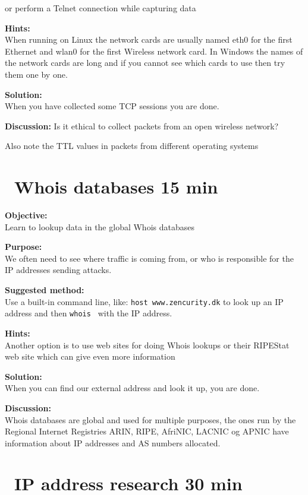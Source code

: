 \documentclass[a4paper,11pt,notitlepage]{report}
\begin{document}
or perform a Telnet connection while capturing data

{\bf Hints:}\\
When running on Linux the network cards are usually named eth0 for the first Ethernet and wlan0 for the first Wireless network card. In Windows the names of the network cards are long and if you cannot see which cards to use then try them one by one.

{\bf Solution:}\\
When you have collected some TCP sessions you are done.

{\bf Discussion:}
Is it ethical to collect packets from an open wireless network?

Also note the TTL values in packets from different operating systems

\chapter{\faExclamationTriangle\ Whois databases 15 min}
\label{ex:whois}

{\bf Objective:}\\
Learn to lookup data in the global Whois databases

{\bf Purpose:}\\
We often need to see where traffic is coming from, or who is responsible for the IP addresses sending attacks.

{\bf Suggested method:}\\
Use a built-in command line, like: \verb+host www.zencurity.dk+ to look up an IP address and then \verb+whois + with the IP address.

{\bf Hints:}\\
Another option is to use web sites for doing Whois lookups  or their RIPEStat web site which can give even more information

{\bf Solution:}\\
When you can find our external address and look it up, you are done.

{\bf Discussion:}\\
Whois databases are global and used for multiple purposes, the ones run by the Regional Internet Registries ARIN, RIPE, AfriNIC, LACNIC og APNIC have information about IP addresses and AS numbers allocated.


\chapter{\faExclamationTriangle\ IP address research 30 min}
\label{ex:ip-address-research}
\end{document}
